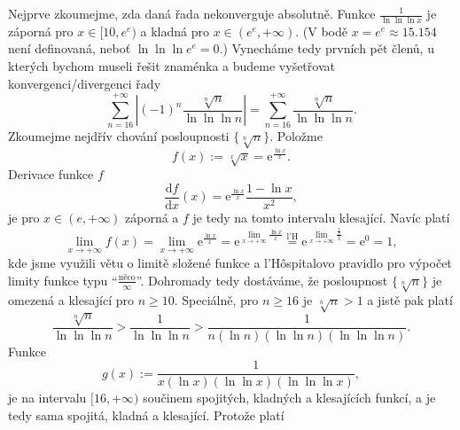 \documentclass[answers]{exam}
\begin{document}
\begin{questions}
  \begin{solution}
  	Nejprve zkoumejme, zda daná řada nekonverguje absolutně. Funkce $\frac{1}{\ln \ln \ln x}$ je záporná pro $x \in [10, e^e)$ a kladná pro $x \in (e^e, +\infty)$. (V bodě $x = e^e \approx 15.154$ není definovaná, neboť $\ln \ln \ln e^e = 0$.) Vynecháme tedy prvních pět členů, u kterých bychom museli řešit znaménka a budeme vyšetřovat konvergenci/divergenci řady
  	\begin{equation}
  		\label{eq:1}
		  \sum_{n = 16}^{+\infty}
		  \left|
				\left( -1 \right)^n
				\frac{\sqrt[n]{n}}{\ln \ln \ln n}
			\right| 
			=		
		  \sum_{n = 16}^{+\infty}
			\frac{\sqrt[n]{n}}{\ln \ln \ln n}.	
  	\end{equation}  	
  	Zkoumejme nejdřív chování posloupnosti $\{ \sqrt[n]{n} \}$. Položme
  	\begin{equation*}
  		f(x) := \sqrt[x]{x} = \mathrm{e}^{\frac{\ln x}{x}}.
  	\end{equation*}
  	Derivace funkce $f$
  	\begin{equation*}
  		\frac{\mathrm{d}f}{\mathrm{d}x}(x)
  		=
  		\mathrm{e}^{\frac{\ln x}{x}} \frac{1 - \ln x}{x^2},
  	\end{equation*}
  	je pro $x \in (e, +\infty)$ záporná a $f$ je tedy na tomto intervalu klesající. Navíc platí
  	\begin{equation*}
  		\lim_{x \to+ \infty}
  		f(x)
  		=
  		\lim_{x \to+ \infty}
  		\mathrm{e}^{\frac{\ln x}{x}}
  		=
  		\mathrm{e}^{\lim_{x \to+ \infty} \frac{\ln x}{x}}
  		\stackrel{\text{l'H}}{=}
  		\mathrm{e}^{\lim_{x \to+ \infty} \frac{\frac{1}{x}}{1}}
  		=
  		\mathrm{e}^0
  		=
  		1,
  	\end{equation*}
  	kde jsme využili větu o limitě složené funkce a l'Hôspitalovo pravidlo pro výpočet limity funkce typu ``$\frac{\textrm{něco}}{\infty}$''. Dohromady tedy dostáváme, že posloupnost $\{ \sqrt[n]{n} \}$ je omezená a klesající pro $n \ge 10$. Speciálně, pro $n \ge 16$ je $\sqrt[n]{n} > 1$ a jistě pak platí
  	\begin{equation}
  		\label{eq:2}
  		\frac{\sqrt[n]{n}}{\ln \ln \ln n}
  		>
  		\frac{1}{\ln \ln \ln n}
  		>
  		\frac{1}{n \left( \ln n \right) \left( \ln \ln n \right) \left( \ln \ln \ln n \right)}.
  	\end{equation}
  	Funkce
  	\begin{equation*}
  		g(x)
  		:=
			\frac{1}{x \left( \ln x \right) \left( \ln \ln x \right) \left( \ln \ln \ln x \right)},
  	\end{equation*}
  	je na intervalu $[16, +\infty)$ součinem spojitých, kladných a klesajících funkcí, a je tedy sama spojitá, kladná a klesající. Protože platí

\end{solution}
\end{questions}
\end{document}
